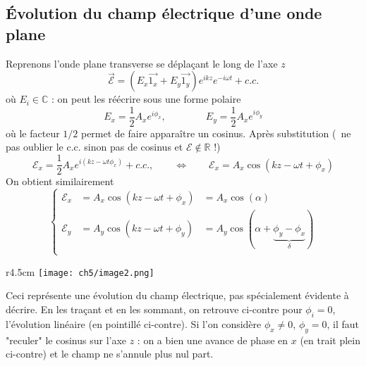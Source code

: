 	\subsection{Évolution du champ électrique d'une onde plane}
	Reprenons l'onde plane transverse se déplaçant le long de l'axe $z$
	\begin{equation}
	\vec{\mathcal{E}} = (E_x\vec{1_x}+E_y\vec{1_y})e^{ikz}e^{-i\omega t} + c.c.
	\end{equation}
	où $E_i\in\mathbb{C}$ : on peut les réécrire sous une forme polaire
	\begin{equation}
	E_x = \frac{1}{2}A_x e^{i\phi_x},\qquad\qquad E_y = \frac{1}{2}A_x e^{i\phi_y}
	\end{equation}
	où le facteur $1/2$ permet de faire apparaître un cosinus. 	Après substitution 
	(\danger\ ne pas oublier le c.c. sinon pas de cosinus et $\mathcal{E}\notin\mathbb{R}$ !)
	\begin{equation}
	\mathcal{E}_x = \frac{1}{2}A_x e^{i(kz-\omega t\phi_x)} + c.c.,\qquad\Leftrightarrow\qquad 
	\mathcal{E}_x = A_x\cos(kz-\omega t +\phi_x)
	\end{equation}
	On obtient similairement
	\begin{equation}
	\left\{\begin{array}{lll}
	\mathcal{E}_x &= A_x\cos(kz-\omega t +\phi_x) &= A_x\cos(\alpha)\\
	\mathcal{E}_y &= A_y\cos(kz-\omega t +\phi_y) &= A_y\cos(\alpha+\underbrace{\phi_y-\phi_x}_{\delta})\\
	\end{array}\right.
	\end{equation}
	
	\begin{wrapfigure}[9]{r}{4.5cm}
	\vspace{-9mm}
	\texttt{[image: ch5/image2.png]}
	\end{wrapfigure}
	Ceci représente une évolution du champ électrique, pas spécialement évidente à décrire. 
	En les traçant et en les sommant, on retrouve ci-contre pour $\phi_i=0$, l'évolution linéaire 
	(en pointillé ci-contre). 
	Si l'on considère $\phi_x\neq0$, $\phi_y=0$, il faut "reculer" le cosinus sur l'axe $z$ : on 
	a bien une avance de phase en $x$ (en trait plein ci-contre) et le champ ne s'annule plus nul 
	part.\\
	
